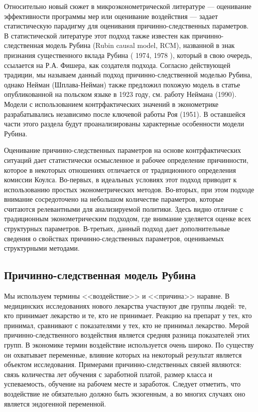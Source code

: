 	
Относительно новый сюжет в микроэконометрической литературе --- оценивание эффективности программы мер или оценивание воздействия --- задает статистическую парадигму для оценивания   причинно-следственных параметров. В статистической литературе этот подход также известен как причинно-следственная модель Рубина (Rubin causal model, RCM), названной в знак признания существенного вклада Рубина ( 1974, 1978 ), который  в свою очередь, ссылается на Р.А. Фишера, как создателя подхода. Согласно действующей традиции, мы называем данный подход причинно-следственной моделью Рубина, однако Нейман (Шплава-Нейман) также предложил похожую модель в статье опубликованной на польском языке в 1923 году, см. работу Неймана (1990). Модели с использованием контрфактических значений в эконометрике разрабатывались независимо после ключевой работы Роя (1951).  В оставшейся части этого раздела будут проанализированы характерные особенности модели Рубина. 


Оценивание причинно-следственных параметров на основе контрфактических ситуаций дает  статистически осмысленное и рабочее  определение причинности, которое в некоторых отношениях отличается от традиционного определения комиссии Коулса. Во-первых, в идеальных условиях этот подход приводит к использованию простых эконометрических методов. Во-вторых, при этом подходе внимание сосредоточено на небольшом количестве параметров, которые считаются релевантными для анализируемой политики. Здесь видно отличие с традиционным эконометрическим подходом, где внимание уделяется оценке всех структурных параметров. В-третьих, данный подход дает дополнительные сведения о свойствах причинно-следственных параметров, оцениваемых структурными методами.
	
\subsection{Причинно-следственная модель Рубина}



Мы используем термины <<воздействие>> и <<причина>> наравне. В медицинских исследованиях нового лекарства участвуют две группы людей: те, кто принимает лекарство и те, кто не принимает. Реакцию на препарат у тех, кто принимал, сравнивают с показателями у тех, кто не принимал лекарство. Мерой причинно-следственного воздействия является средняя разница показателей этих групп. В экономике термин воздействие используется очень широко. По существу он охватывает переменные, влияние которых на некоторый результат является объектом исследования. Примерами причинно-следственных связей являются: связь количества лет обучения с заработной платой, размер класса и успеваемость, обучение на рабочем месте и заработок. Следует отметить, что воздействие не обязательно должно быть экзогенным, а во многих случаях оно является эндогенной переменной.


